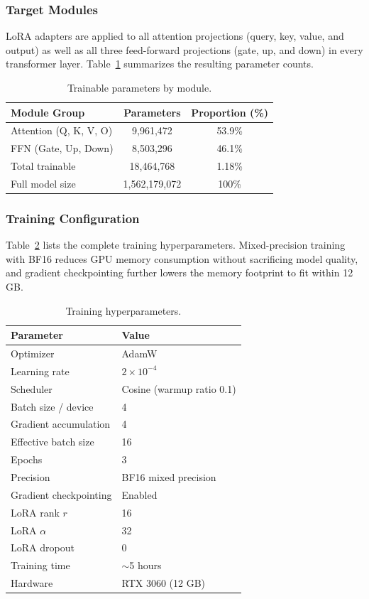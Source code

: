 \documentclass[12pt,a4paper]{article}
\begin{document}
\subsubsection{Target Modules}

LoRA adapters are applied to all attention projections (query, key, value, and output) as well as all three feed-forward projections (gate, up, and down) in every transformer layer. Table~\ref{tab:lora_params} summarizes the resulting parameter counts.

\begin{table}[ht]
\centering
\caption{Trainable parameters by module.}
\label{tab:lora_params}
\begin{tabular}{lcc}
\toprule
\textbf{Module Group} & \textbf{Parameters} & \textbf{Proportion (\%)} \\
\midrule
Attention (Q, K, V, O) & 9,961,472 & 53.9\% \\
FFN (Gate, Up, Down) & 8,503,296 & 46.1\% \\
\midrule
Total trainable & 18,464,768 & 1.18\% \\
Full model size & 1,562,179,072 & 100\% \\
\bottomrule
\end{tabular}
\end{table}

\subsubsection{Training Configuration}

Table~\ref{tab:training_config} lists the complete training hyperparameters. Mixed-precision training with BF16 reduces GPU memory consumption without sacrificing model quality, and gradient checkpointing further lowers the memory footprint to fit within 12 GB.

\begin{table}[ht]
\centering
\caption{Training hyperparameters.}
\label{tab:training_config}
\begin{tabular}{ll}
\toprule
\textbf{Parameter} & \textbf{Value} \\
\midrule
Optimizer & AdamW \\
Learning rate & $2 \times 10^{-4}$ \\
Scheduler & Cosine (warmup ratio 0.1) \\
Batch size / device & 4 \\
Gradient accumulation & 4 \\
Effective batch size & 16 \\
Epochs & 3 \\
Precision & BF16 mixed precision \\
Gradient checkpointing & Enabled \\
LoRA rank $r$ & 16 \\
LoRA $\alpha$ & 32 \\
LoRA dropout & 0 \\
\midrule
Training time & $\sim$5 hours \\
Hardware & RTX 3060 (12 GB) \\
\bottomrule
\end{tabular}
\end{table}
\end{document}
